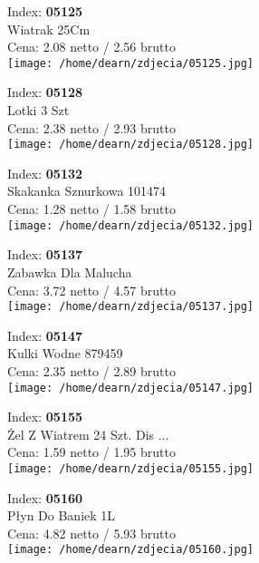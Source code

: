 {Index: \textbf{05125}\\
Wiatrak 25Cm\\
Cena: 2.08 netto / 2.56 brutto\\
  \texttt{[image: /home/dearn/zdjecia/05125.jpg]}}\newline\newline

{Index: \textbf{05128}\\
Lotki 3 Szt\\
Cena: 2.38 netto / 2.93 brutto\\
  \texttt{[image: /home/dearn/zdjecia/05128.jpg]}}\newline\newline

{Index: \textbf{05132}\\
Skakanka Sznurkowa 101474\\
Cena: 1.28 netto / 1.58 brutto\\
  \texttt{[image: /home/dearn/zdjecia/05132.jpg]}}\newline\newline

{Index: \textbf{05137}\\
Zabawka Dla Malucha\\
Cena: 3.72 netto / 4.57 brutto\\
  \texttt{[image: /home/dearn/zdjecia/05137.jpg]}}\newline\newline

{Index: \textbf{05147}\\
Kulki Wodne 879459\\
Cena: 2.35 netto / 2.89 brutto\\
  \texttt{[image: /home/dearn/zdjecia/05147.jpg]}}\newline\newline

{Index: \textbf{05155}\\
Żel Z Wiatrem 24 Szt. Dis ...\\
Cena: 1.59 netto / 1.95 brutto\\
  \texttt{[image: /home/dearn/zdjecia/05155.jpg]}}\newline\newline

{Index: \textbf{05160}\\
Płyn Do Baniek 1L\\
Cena: 4.82 netto / 5.93 brutto\\
  \texttt{[image: /home/dearn/zdjecia/05160.jpg]}}\newline\newline

